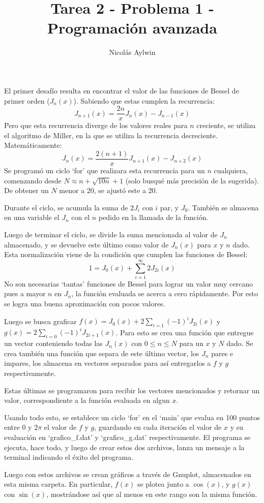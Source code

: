 \documentclass[12pt]{article}
\title{Tarea 2 - Problema 1 - Programación avanzada}
\author{Nicolás Aylwin}
\date{}
\begin{document}
\maketitle
El primer desafío resulta en encontrar el valor de las funciones de Bessel de primer orden ($J_n(x)$). Sabiendo que estas cumplen la recurrencia:
\begin{equation*}
J_{n+1}(x)=\frac{2n}{x}J_n(x)-J_{n-1}(x)
\end{equation*}
Pero que esta recurrencia diverge de los valores reales para $n$ creciente, se utiliza el algoritmo de Miller, en la que se utiliza la recurrencia decreciente. Matemáticamente:
\begin{equation*}
J_n(x)=\frac{2(n+1)}{x}J_{n+1}(x)-J_{n+2}(x)
\end{equation*}
Se programó un ciclo `for' que realizara esta recurrencia para un $n$ cualquiera, comenzando desde $N\approx n+\sqrt{10n}+1$ (solo busqué más precisión de la sugerida). De obtener un $N$ menor a 20, se ajustó este a 20.

Durante el ciclo, se acumula la suma de $2J_i$ con $i$ par, y $J_0$. También se almacena en una variable el $J_n$ con el $n$ pedido en la llamada de la función.

Luego de terminar el ciclo, se divide la suma mencionada al valor de $J_n$ almacenado, y se devuelve este último como valor de $J_n(x)$ para $x$ y $n$ dado. Esta normalización viene de la condición que cumplen las funciones de Bessel:
\begin{equation*}
1=J_0(x)+\sum_{i=1}^{\infty}2J_{2i}(x)
\end{equation*}
No son necesarias `tantas' funciones de Bessel para lograr un valor muy cercano pues a mayor $n$ en $J_n$, la función evaluada se acerca a cero rápidamente. Por esto se logra una buena aproximación con pocos valores.

Luego se busca graficar $f(x)=J_0(x)+2\sum_{i=1}(-1)^{i}J_{2i}(x)$ y $g(x)=2\sum_{i=0}(-1)^iJ_{2i+1}(x)$. Para esto se crea una función que entregue un vector conteniendo todas las $J_n(x)$ con $0\leq n\leq N$ para un $x$ y $N$ dado. Se crea también una función que separa de este último vector, los $J_n$ pares e impares, los almacena en vectores separados para así entregarlos a $f$ y $g$ respectivamente.

Estas últimas se programaron para recibir los vectores mencionados y retornar un valor, correspondiente a la función evaluada en algun $x$.

Usando todo esto, se establece un ciclo `for' en el `main' que evalua en 100 puntos entre $0$ y $2\pi$ el valor de $f$ y $g$, guardando en cada iteración el valor de $x$ y su evaluación en  `grafico\_f.dat' y `grafico\_g.dat' respectivamente. El programa se ejecuta, hace todo, y luego de crear estos dos archivos, lanza un mensaje a la terminal indicando el éxito del programa.

Luego con estos archivos se crean gráficos a través de Gnuplot, almacenados en esta misma carpeta. En particular, $f(x)$ se plotea junto a $\cos(x)$, y $g(x)$ con $\sin(x)$, mostrándose así que al menos en este rango son la misma función.
\end{document}

